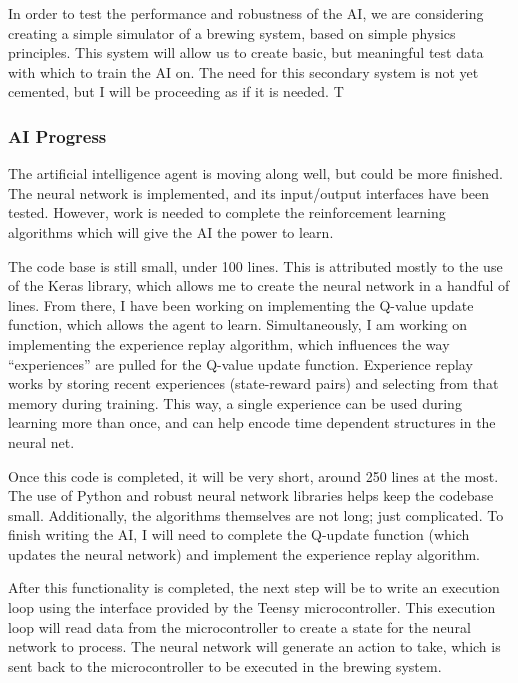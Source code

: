 \documentclass[draftclsnofoot,onecolumn,letterpaper,10pt]{IEEEtran}
\begin{document}
In order to test the performance and robustness of the AI, we are considering creating a simple simulator of a brewing system, based on simple physics principles.
This system will allow us to create basic, but meaningful test data with which to train the AI on.
The need for this secondary system is not yet cemented, but I will be proceeding as if it is needed.
T


\subsubsection{AI Progress}
The artificial intelligence agent is moving along well, but could be more finished.
The neural network is implemented, and its input/output interfaces have been tested.
However, work is needed to complete the reinforcement learning algorithms which will give the AI the power to learn.

The code base is still small, under 100 lines.
This is attributed mostly to the use of the Keras library, which allows me to create the neural network in a handful of lines.
From there, I have been working on implementing the Q-value update function, which allows the agent to learn.
Simultaneously, I am working on implementing the experience replay algorithm, which influences the way ``experiences'' are pulled for the Q-value update function.
Experience replay works by storing recent experiences (state-reward pairs) and selecting from that memory during training.
This way, a single experience can be used during learning more than once, and can help encode time dependent structures in the neural net.

Once this code is completed, it will be very short, around 250 lines at the most. The use of Python and robust neural network libraries helps keep the codebase small. Additionally, the algorithms themselves are not long; just complicated.
To finish writing the AI, I will need to complete the Q-update function (which updates the neural network) and implement the experience replay algorithm.

After this functionality is completed, the next step will be to write an execution loop using the interface provided by the Teensy microcontroller.
This execution loop will read data from the microcontroller to create a state for the neural network to process.
The neural network will generate an action to take, which is sent back to the microcontroller to be executed in the brewing system.
\end{document}
